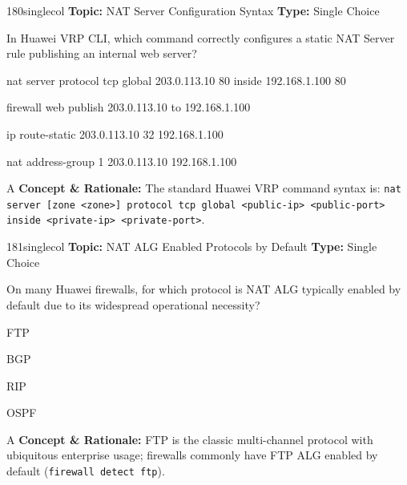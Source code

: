 \begin{qcard}{180}{singlecol}
\textcolor{darkslate!75}{\small\textbf{Topic:} NAT Server Configuration Syntax \hfill \textbf{Type:} Single Choice}\vspace{0.4em}\par
In Huawei VRP CLI, which command correctly configures a static NAT Server rule publishing an internal web server?
\begin{qoptions}
\item nat server protocol tcp global 203.0.113.10 80 inside 192.168.1.100 80
\item firewall web publish 203.0.113.10 to 192.168.1.100
\item ip route-static 203.0.113.10 32 192.168.1.100
\item nat address-group 1 203.0.113.10 192.168.1.100
\end{qoptions}
\end{qcard}
\nopagebreak
\begin{explainbox}{A}
\textbf{Concept \& Rationale:} The standard Huawei VRP command syntax is: \texttt{nat server [zone \textless{}zone\textgreater{}] protocol tcp global \textless{}public-ip\textgreater{} \textless{}public-port\textgreater{} inside \textless{}private-ip\textgreater{} \textless{}private-port\textgreater{}}.
\end{explainbox}

\begin{qcard}{181}{singlecol}
\textcolor{darkslate!75}{\small\textbf{Topic:} NAT ALG Enabled Protocols by Default \hfill \textbf{Type:} Single Choice}\vspace{0.4em}\par
On many Huawei firewalls, for which protocol is NAT ALG typically enabled by default due to its widespread operational necessity?
\begin{qoptions}
\item FTP
\item BGP
\item RIP
\item OSPF
\end{qoptions}
\end{qcard}
\nopagebreak
\begin{explainbox}{A}
\textbf{Concept \& Rationale:} FTP is the classic multi-channel protocol with ubiquitous enterprise usage; firewalls commonly have FTP ALG enabled by default (\texttt{firewall detect ftp}).
\end{explainbox}

